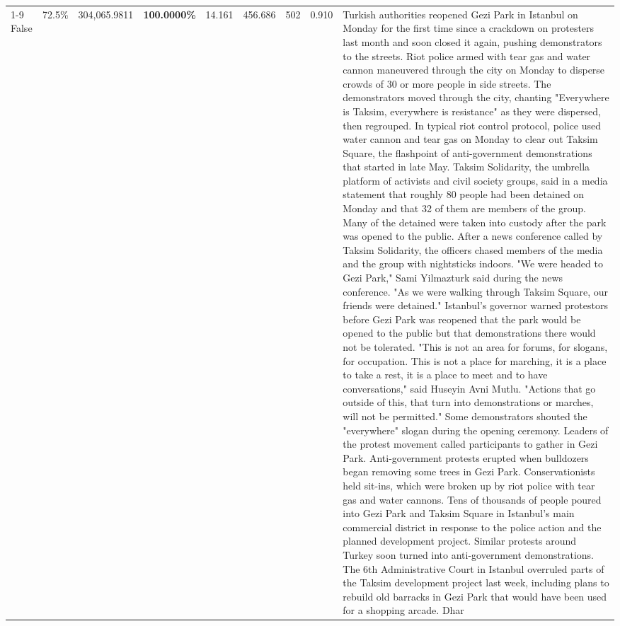 \begin{table}[H]
\begin{tabular}{lllrlllll}
\cline{1-9}
False & 72.5\% & 304,065.9811 & \bfseries \color{red} 100.0000\% & 14.161 & 456.686 & 502 & 0.910 & Turkish authorities reopened Gezi Park in Istanbul on Monday for the first time since a crackdown on protesters last month and soon closed it again, pushing demonstrators to the streets. Riot police armed with tear gas and water cannon maneuvered through the city on Monday to disperse crowds of 30 or more people in side streets. The demonstrators moved through the city, chanting "Everywhere is Taksim, everywhere is resistance" as they were dispersed, then regrouped. In typical riot control protocol, police used water cannon and tear gas on Monday to clear out Taksim Square, the flashpoint of anti-government demonstrations that started in late May. Taksim Solidarity, the umbrella platform of activists and civil society groups, said in a media statement that roughly 80 people had been detained on Monday and that 32 of them are members of the group. Many of the detained were taken into custody after the park was opened to the public. After a news conference called by Taksim Solidarity, the officers chased members of the media and the group with nightsticks indoors. "We were headed to Gezi Park," Sami Yilmazturk said during the news conference. "As we were walking through Taksim Square, our friends were detained." Istanbul's governor warned protestors before Gezi Park was reopened that the park would be opened to the public but that demonstrations there would not be tolerated. "This is not an area for forums, for slogans, for occupation. This is not a place for marching, it is a place to take a rest, it is a place to meet and to have conversations," said Huseyin Avni Mutlu. "Actions that go outside of this, that turn into demonstrations or marches, will not be permitted." Some demonstrators shouted the "everywhere" slogan during the opening ceremony. Leaders of the protest movement called participants to gather in Gezi Park. Anti-government protests erupted when bulldozers began removing some trees in Gezi Park. Conservationists held sit-ins, which were broken up by riot police with tear gas and water cannons. Tens of thousands of people poured into Gezi Park and Taksim Square in Istanbul's main commercial district in response to the police action and the planned development project. Similar protests around Turkey soon turned into anti-government demonstrations. The 6th Administrative Court in Istanbul overruled parts of the Taksim development project last week, including plans to rebuild old barracks in Gezi Park that would have been used for a shopping arcade. Dhar \\

\end{tabular}
\end{table}
